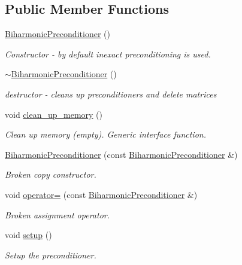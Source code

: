 \subsection*{Public Member Functions}
\begin{DoxyCompactItemize}
\item 
\hyperlink{classoomph_1_1BiharmonicPreconditioner_a0cd4b515f53dfa4a84a5ce78e555ff9e}{Biharmonic\+Preconditioner} ()
\begin{DoxyCompactList}\small\item\em Constructor -\/ by default inexact preconditioning is used. \end{DoxyCompactList}\item 
\hyperlink{classoomph_1_1BiharmonicPreconditioner_a589dcedc9044e01c438b17e15b7f7037}{$\sim$\+Biharmonic\+Preconditioner} ()
\begin{DoxyCompactList}\small\item\em destructor -\/ cleans up preconditioners and delete matrices \end{DoxyCompactList}\item 
void \hyperlink{classoomph_1_1BiharmonicPreconditioner_a1eec48fe85c0246c1a9ba1ad4cfa74e6}{clean\+\_\+up\+\_\+memory} ()
\begin{DoxyCompactList}\small\item\em Clean up memory (empty). Generic interface function. \end{DoxyCompactList}\item 
\hyperlink{classoomph_1_1BiharmonicPreconditioner_aa4890df601c3f22f610e74b4de368be3}{Biharmonic\+Preconditioner} (const \hyperlink{classoomph_1_1BiharmonicPreconditioner}{Biharmonic\+Preconditioner} \&)
\begin{DoxyCompactList}\small\item\em Broken copy constructor. \end{DoxyCompactList}\item 
void \hyperlink{classoomph_1_1BiharmonicPreconditioner_a14371fe8cc3e28618018a75d83499ea5}{operator=} (const \hyperlink{classoomph_1_1BiharmonicPreconditioner}{Biharmonic\+Preconditioner} \&)
\begin{DoxyCompactList}\small\item\em Broken assignment operator. \end{DoxyCompactList}\item 
void \hyperlink{classoomph_1_1BiharmonicPreconditioner_a8f4c9b8a387e27191659e528f0ff82a1}{setup} ()
\begin{DoxyCompactList}\small\item\em Setup the preconditioner. \end{DoxyCompactList}\item 

\end{DoxyCompactItemize}
